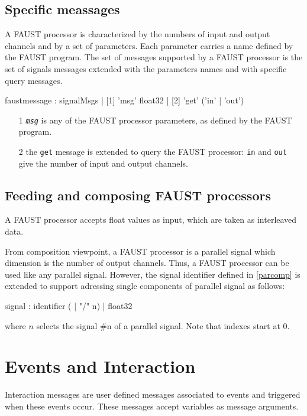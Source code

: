 \documentclass[a4paper,twoside]{report}
\newcommand{\toplevel}[1]	{\chapter{#1}}
\newcommand{\sublevel}[1]	{\section{#1}}
\newcommand{\OSC}[1]		{\texttt{#1}}
\begin{document}
\sublevel{Specific meassages}
\label{faustmsg}
A FAUST processor is characterized by the numbers of input and output channels and by a set of parameters. Each parameter carries a name defined by the FAUST program. The set of messages supported by a FAUST processor is the set of signals messages extended with the parameters names and with specific query messages. 

\begin{rail}
faustmessage : signalMsgs
			 | [1] 'msg' float32
			 | [2] 'get' ('in' | 'out')
\end{rail}

\begin{itemize}
\item [1] \OSC{\emph{msg}} is any of the FAUST processor parameters, as defined by the FAUST program.
\item [2] the \OSC{get} message is extended to query the FAUST processor: \OSC{in} and \OSC{out} give the number of input and output channels.
\end{itemize}


\sublevel{Feeding and composing FAUST processors}
\label{composefaust}

A FAUST processor accepts float values as input, which are taken as interleaved data.

From composition viewpoint, a FAUST processor is a parallel signal which dimension is the number of output channels. 
Thus, a FAUST processor can be used like any parallel signal. However, the signal identifier defined in \ref{parcomp} is extended to support adressing single components of parallel signal as follows:
\begin{rail}
signal :  
		  identifier ( | "/" n)
		| float32
\end{rail}
where $n$ selects the signal \#n of a parallel signal. Note that indexes start at 0.


\toplevel{Events and Interaction}
\label{interaction}

Interaction messages are user defined messages associated to events and triggered when these events occur. These messages accept variables as message arguments.
\end{document}
